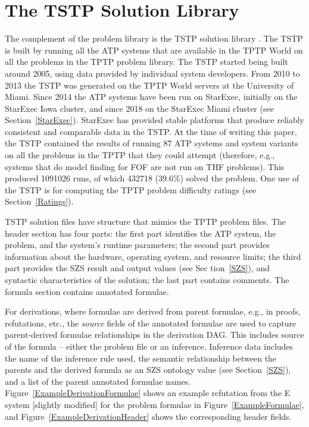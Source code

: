 \documentclass{easychair}
\begin{document}
\section{The TSTP Solution Library}
\label{TSTP}

The complement of the problem library is the TSTP solution library \cite{Sut07-CSR,Sut10}.
The TSTP is built by running all the ATP systems that are available in the TPTP World on
all the problems in the TPTP problem library.
The TSTP started being built around 2005, using data provided by individual system developers.
From 2010 to 2013 the TSTP was generated on the TPTP World servers at the University of Miami. 
Since 2014 the ATP systems have been run on StarExec, initially on the StarExec Iowa cluster, 
and since 2018 on the StarExec Miami cluster (see Section~\ref{StarExec}). 
StarExec has provided stable platforms that produce reliably consistent and comparable data in 
the TSTP.
At the time of writing this paper, the TSTP contained the results of running 87 ATP systems and 
system variants on all the problems in the TPTP that they could attempt
(therefore, e.g., systems that do model finding for FOF are not run on THF problems).
This produced 1091026 runs, of which 432718 (39.6\%) solved the problem.
One use of the TSTP is for computing the TPTP problem difficulty ratings (see 
Section~\ref{Ratings}).

TSTP solution files have structure that mimics the TPTP problem files.
The header section has four parts: 
the first part identifies the ATP system, the problem, and the system's runtime parameters; 
the second part provides information about the hardware, operating system, and resource limits; 
the third part provides the SZS result and output values (see Sec tion~\ref{SZS}), and syntactic 
characteristics of the solution; the last part contains comments.
The formula section contains annotated formulae. 

For derivations, where formulae are derived from parent formulae, e.g., in proofs, refutations, 
etc., the {\em source} fields of the annotated formulae are used to capture parent-derived 
formulae relationships in the derivation DAG.
This includes source of the formula -- either the problem file or an inference.
Inference data includes the name of the inference rule used, the semantic relationship between 
the parents and the derived formula as an SZS ontology value (see Section~\ref{SZS}), and a 
list of the parent annotated formulae names.
Figure~\ref{ExampleDerivationFormulae} shows an example refutation from the E system \cite{SCV19} 
[slightly modified] for the problem formulae in Figure~\ref{ExampleFormulae}, and 
Figure~\ref{ExampleDerivationHeader} shows the corresponding header fields.
\end{document}
